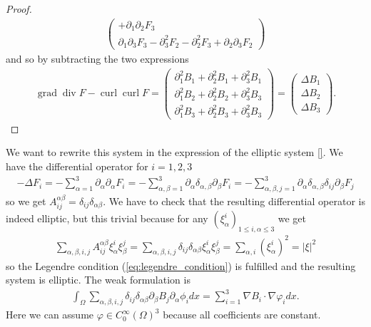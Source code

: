 \documentclass[12pt,a4paper]{article}
\numberwithin{equation}{subsection}
\numberwithin{lemma}{subsection}
\theoremstyle{definition}
\DeclareMathOperator{\curl}{curl}
\DeclareMathOperator{\diver}{div}
\DeclareMathOperator{\grad}{grad}
\begin{document}
\begin{proof}
\begin{align*}
\begin{pmatrix}
            + \partial_1 \partial_2 F_3
            \\ \partial_1 \partial_3 F_3 - \partial^2_3 F_2 - \partial_2^2 F_3
            + \partial_2 \partial_3 F_2  
            \end{pmatrix}
    \end{align*}
    and so by subtracting the two expressions
    \begin{align*}
        \grad \diver F - \curl \curl F  
        = \begin{pmatrix}
            \partial_1^2 B_1 + \partial_2^2 B_1 + \partial_3^2 B_1
            \\ \partial_1^2 B_2 + \partial_2^2 B_2 + \partial_3^2 B_3
            \\ \partial_1^2 B_3 + \partial_2^2 B_3 + \partial_3^2 B_3
        \end{pmatrix}
        = \begin{pmatrix}
            \Delta B_1 \\ \Delta B_2 \\ \Delta B_3
        \end{pmatrix}.
    \end{align*}
\end{proof}
We want to rewrite this system in the expression of the elliptic system 
\ref{}. We have the differential operator for $i = 1,2,3$
\begin{align*}
    - \Delta F_i = - \sum\limits_{\alpha = 1}^3 
        \partial_\alpha \partial_\alpha F_i
    = - \sum\limits_{\alpha,\beta = 1}^3 
    \partial_\alpha \delta_{\alpha,\beta} \partial_\beta F_i
    = - \sum\limits_{\alpha,\beta,j = 1}^3 
    \partial_\alpha \delta_{\alpha,\beta} \delta_{ij} \partial_\beta F_j
\end{align*}
so we get $A_{ij}^{\alpha\beta} = \delta_{ij} \delta_{\alpha \beta}$.
We have to check that the resulting differential operator is indeed
elliptic, but this trivial because for any 
$(\xi_\alpha^i)_{1\leq i,\alpha \leq 3}$
we get 
\begin{align*}
    \sum\limits_{\alpha,\beta,i,j} A_{ij}^{\alpha\beta} \xi_\alpha^i \xi_\beta^j 
    = \sum\limits_{\alpha,\beta,i,j} \delta_{ij} \delta_{\alpha \beta} 
        \xi_\alpha^i \xi_\beta^j 
    = \sum\limits_{\alpha,i} (\xi_\alpha^i)^2 = |\xi|^2
\end{align*}
so  the Legendre condition (\ref{eq:legendre_condition}) 
is fulfilled and the resulting system is elliptic. The weak formulation 
is 
\begin{align*}
    \int_\Omega \sum\limits_{\alpha,\beta,i,j} \delta_{ij} \delta_{\alpha\beta}
        \partial_\beta B_j \partial_\alpha \phi_i dx 
    = \sum\limits_{i=1}^3 \nabla B_i \cdot \nabla \varphi_i dx.
\end{align*}
Here we can assume $\varphi \in C_0^\infty (\Omega)^3$ because all coefficients
are constant.
\end{document}
